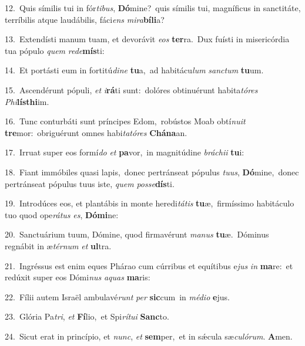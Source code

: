 {\numbfont\textcolor{\numbcolor}{12.}}~Quis símilis tui in fór\-\textit{ti}\-\textit{bus}, \textbf{Dó}\-mine?~\star quis símilis tui, magníficus in sanctitáte, terríbilis atque laudábilis, fáci\textit{ens} \textit{mi}\-\textit{ra}\textbf{bí}\textbf{li}a?\par
{\numbfont\textcolor{\numbcolor}{13.}}~Extendísti manum tuam, et devorávit \textit{e}\-\textit{os} \textbf{ter}\-ra.~\star Dux fuísti in misericórdia tua pópulo \textit{quem} \textit{red}\-\textit{e}\textbf{mís}ti:\par
{\numbfont\textcolor{\numbcolor}{14.}}~Et portásti eum in fortitú\-\textit{di}\-\textit{ne} \textbf{tu}\-a,~\star ad habitácu\textit{lum} \textit{sanc}\-\textit{tum} \textbf{tu}\-um.\par
{\numbfont\textcolor{\numbcolor}{15.}}~Ascendérunt pópuli, \textit{et} \textit{i}\-\textbf{rá}ti sunt:~\star dolóres obtinuérunt habita\-\textit{tó}\-\textit{res} \textit{Phi}\-\textbf{lís}\textbf{thi}im.\par
{\numbfont\textcolor{\numbcolor}{16.}}~Tunc conturbáti sunt príncipes Edom,~\dagger robústos Moab obtí\-\textit{nu}\-\textit{it} \textbf{tre}\-mor:~\star obriguérunt omnes habi\-\textit{ta}\-\textit{tó}\textit{res} \textbf{Chá}\-\textbf{na}an.\par
{\numbfont\textcolor{\numbcolor}{17.}}~Irruat super eos formí\textit{do} \textit{et} \textbf{pa}\-vor,~\star in magnitúdine \textit{brá}\-\textit{chi}\textit{i} \textbf{tu}\-i:\par
{\numbfont\textcolor{\numbcolor}{18.}}~Fiant immóbiles quasi lapis,~\dagger donec pertránseat pópulus \textit{tu}\-\textit{us}, \textbf{Dó}\-mine,~\star donec pertránseat pópulus tuus iste, \textit{quem} \textit{pos}\-\textit{se}\textbf{dís}ti.\par
{\numbfont\textcolor{\numbcolor}{19.}}~Introdúces eos, et plantábis in monte heredi\-\textit{tá}\-\textit{tis} \textbf{tu}\-æ,~\star firmíssimo habitáculo tuo quod ope\-\textit{rá}\-\textit{tus} \textit{es}\-, \textbf{Dó}\-\textbf{mi}ne:\par
{\numbfont\textcolor{\numbcolor}{20.}}~Sanctuárium tuum, Dómine, quod firmavérunt \textit{ma}\-\textit{nus} \textbf{tu}\-æ.~\star Dóminus regnábit in æ\-\textit{tér}\-\textit{num} \textit{et} \textbf{ul}\-tra.\par
{\numbfont\textcolor{\numbcolor}{21.}}~Ingréssus est enim eques Phárao cum cúrribus et equítibus e\textit{jus} \textit{in} \textbf{ma}\-re:~\star et redúxit super eos Dómi\textit{nus} \textit{a}\-\textit{quas} \textbf{ma}\-ris:\par
{\numbfont\textcolor{\numbcolor}{22.}}~Fílii autem Israël ambulavé\textit{runt} \textit{per} \textbf{sic}\-cum~\star in \textit{mé}\-\textit{di}\textit{o} \textbf{e}\-jus.\par
{\numbfont\textcolor{\numbcolor}{23.}}~Glória Pa\-\textit{tri}\-, \textit{et} \textbf{Fí}\-lio,~\star et Spi\-\textit{rí}\-\textit{tu}\textit{i} \textbf{Sanc}\-to.\par
{\numbfont\textcolor{\numbcolor}{24.}}~Sicut erat in princípio, et \textit{nunc}\-, \textit{et} \textbf{sem}\-per,~\star et in sǽcula sæ\-\textit{cu}\-\textit{ló}\textit{rum}. \textbf{A}\-men.\par
